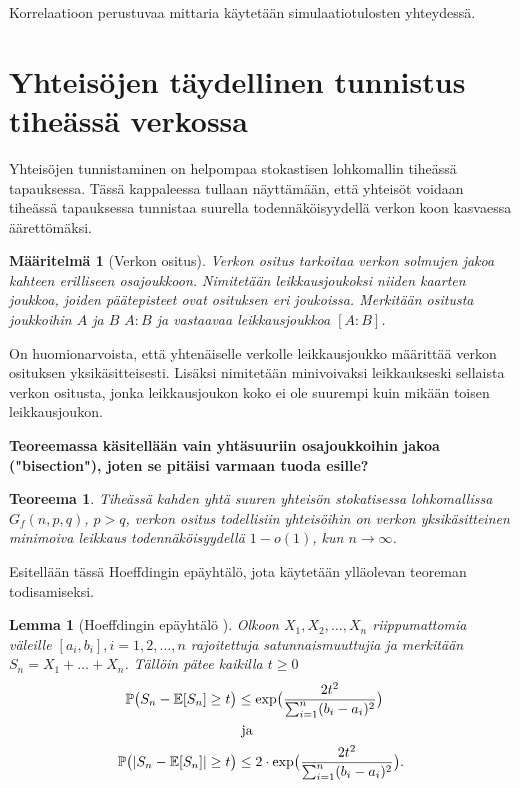 \documentclass[finnish,12pt,a4paper,pdftex,sci,utf8]{aaltothesis}
\newtheorem{lemma}{Lemma}
\newtheorem{teoreema}{Teoreema}
\newtheorem{definition}{Määritelmä}
\begin{document}
Korrelaatioon perustuvaa mittaria käytetään simulaatiotulosten yhteydessä.

\clearpage

\section{Yhteisöjen täydellinen tunnistus tiheässä verkossa}
Yhteisöjen tunnistaminen on helpompaa stokastisen lohkomallin tiheässä tapauksessa. Tässä kappaleessa tullaan näyttämään, että yhteisöt voidaan tiheässä tapauksessa tunnistaa suurella todennäköisyydellä verkon koon kasvaessa äärettömäksi.

\begin{definition}[Verkon ositus]
	Verkon ositus tarkoitaa verkon solmujen jakoa kahteen erilliseen osajoukkoon. Nimitetään leikkausjoukoksi niiden kaarten joukkoa, joiden päätepisteet ovat osituksen eri joukoissa. Merkitään ositusta joukkoihin $A$ ja $B$ $A:B$ ja vastaavaa leikkausjoukkoa $[A:B]$.
\end{definition}


On huomionarvoista, että yhtenäiselle verkolle leikkausjoukko määrittää verkon osituksen yksikäsitteisesti. Lisäksi nimitetään minivoivaksi leikkaukseski sellaista verkon ositusta, jonka leikkausjoukon koko ei ole suurempi kuin mikään toisen leikkausjoukon.

\textbf{Teoreemassa käsitellään vain yhtäsuuriin osajoukkoihin jakoa ("bisection"), joten se pitäisi varmaan tuoda esille?}

\begin{teoreema}
	\label{teoreema:mincut}
	Tiheässä kahden yhtä suuren yhteisön stokatisessa lohkomallissa $G_f(n,p,q)$, $p > q$, verkon ositus todellisiin yhteisöihin on verkon yksikäsitteinen minimoiva leikkaus todennäköisyydellä $1-o(1)$, kun $n \rightarrow \infty$.
\end{teoreema}

Esitellään tässä Hoeffdingin epäyhtälö, jota käytetään ylläolevan teoreman todisamiseksi.


\begin{lemma}[Hoeffdingin epäyhtälö \cite{Hoeffding}]
	\label{lemma:Hoeffding}
	Olkoon $X_1, X_2, \ldots, X_n$ riippumattomia väleille $[a_i, b_i], i = 1, 2,  \ldots, n$ rajoitettuja satunnaismuuttujia ja merkitään $S_n = X_1 + \ldots + X_n$. Tällöin pätee kaikilla $t \geq 0$
	\begin{align*}
		\mathbb{P} \big( S_n - \mathbb{E}[S_n] \geq t \big) &\leq \textnormal{exp} \big( \frac{2t^2}{\sum_{i=1}^{n} (b_i - a_i)^2} \big) \\
		& \text{ ja } \\
		\mathbb{P}\big(|S_n - \mathbb{E}[S_n]| \geq t \big) &\leq 2 \cdot \textnormal{exp} \big( \frac{2t^2}{\sum_{i=1}^{n} (b_i - a_i)^2} \big).	
	\end{align*}
\end{lemma}
\end{document}

